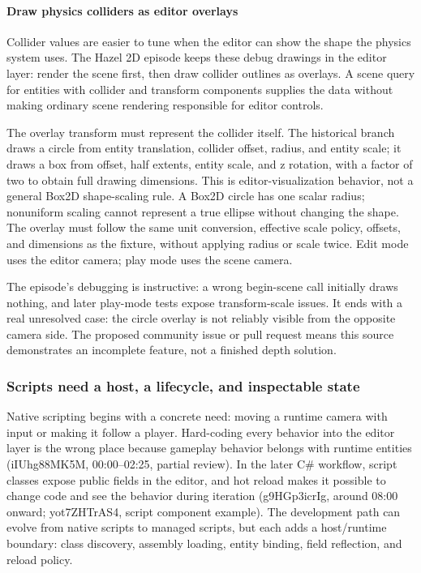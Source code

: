 \paragraph{Draw physics colliders as editor overlays}\label{draw-physics-colliders-as-editor-overlays}

Collider values are easier to tune when the editor can show the shape the physics system uses. The Hazel 2D episode keeps these debug drawings in the editor layer: render the scene first, then draw collider outlines as overlays. A scene query for entities with collider and transform components supplies the data without making ordinary scene rendering responsible for editor controls.

The overlay transform must represent the collider itself. The historical branch draws a circle from entity translation, collider offset, radius, and entity scale; it draws a box from offset, half extents, entity scale, and z rotation, with a factor of two to obtain full drawing dimensions. This is editor-visualization behavior, not a general Box2D shape-scaling rule. A Box2D circle has one scalar radius; nonuniform scaling cannot represent a true ellipse without changing the shape. The overlay must follow the same unit conversion, effective scale policy, offsets, and dimensions as the fixture, without applying radius or scale twice. Edit mode uses the editor camera; play mode uses the scene camera.

The episode's debugging is instructive: a wrong begin-scene call initially draws nothing, and later play-mode tests expose transform-scale issues. It ends with a real unresolved case: the circle overlay is not reliably visible from the opposite camera side. The proposed community issue or pull request means this source demonstrates an incomplete feature, not a finished depth solution.

\subsubsection{Scripts need a host, a lifecycle, and inspectable state}\label{scripts-need-a-host-a-lifecycle-and-inspectable-state}

Native scripting begins with a concrete need: moving a runtime camera with input or making it follow a player. Hard-coding every behavior into the editor layer is the wrong place because gameplay behavior belongs with runtime entities (iIUhg88MK5M, 00:00--02:25, partial review). In the later C\# workflow, script classes expose public fields in the editor, and hot reload makes it possible to change code and see the behavior during iteration (g9HGp3icrIg, around 08:00 onward; yot7ZHTrAS4, script component example). The development path can evolve from native scripts to managed scripts, but each adds a host/runtime boundary: class discovery, assembly loading, entity binding, field reflection, and reload policy.

